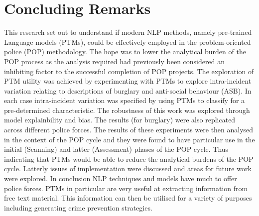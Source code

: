 \section{Concluding Remarks} This research set out to understand if modern NLP methods, namely pre-trained Language models (PTMs), could be effectively employed in the problem-oriented police (POP) methodology. The hope was to lower the analytical burden of the POP process as the analysis required had previously been considered an inhibiting factor to the successful completion of POP projects.  The exploration of PTM utility was achieved by experimenting with PTMs to explore intra-incident variation relating to descriptions of burglary and anti-social behaviour (ASB). In each case intra-incident variation was specified by using PTMs to classify for a pre-determined characteristic. The robustness of this work was explored through model explainbility and bias. The results (for burglary) were also replicated across different police forces. The results of these experiments were then analysed in the context of the POP cycle and they were found to have particular use in the initial (Scanning) and latter (Assessment) phases of the POP cycle. Thus indicating that PTMs would be able to reduce the analytical burdens of the POP cycle. Latterly issues of implementation were discussed and areas for future work were explored.  In conclusion NLP techniques and models have much to offer police forces. PTMs in particular are very useful at extracting information from free text material. This information can then be utilised for a variety of purposes including generating crime prevention strategies. 







